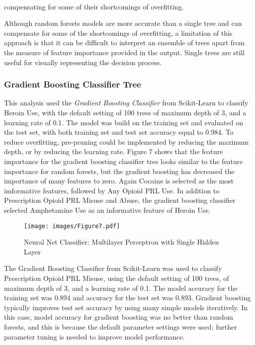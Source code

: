 \\\documentclass[sigconf]{acmart}
\begin{document}
compensating for some of their shortcomings of overfitting.

Although random forests models are more accurate than a single tree and can
compensate for some of the shortcomings of overfitting, a limitation of this 
approach is that it can be difficult to interpret an ensemble of trees apart 
from the measure of feature importance provided in the output. Single trees 
are still useful for visually representing the decision process.

\subsubsection{Gradient Boosting Classifier Tree}


This analysis used the 
\emph{Gradient Boosting Classifier} from Scikit-Learn to classify Heroin Use, 
with the default setting of 100 trees of maximum depth of 3, and a learning 
rate of 0.1. The model was build on the training set and evaluated on the test 
set, with both training set and test set accuracy equal to 0.984. To reduce
overfitting, pre-pruning could be implemented by reducing the maximum depth, 
or by reducing the learning rate. Figure 7 shows that the feature importance 
for the gradient boosting classifier tree looks similar to the feature 
importance for random forests, but the gradient boosting has decreased the 
importance of many features to zero. Again Cocaine is selected as the most 
imformative features, followed by Any Opioid PRL Use. In addition to 
Prescription Opioid PRL Misuse and Abuse, the gradient boosting classifier 
selected Amphetamine Use as an informative feature of Heroin Use. 

\begin{figure}[!ht]
  \centering\texttt{[image: images/Figure7.pdf]}
  \caption{Neural Net Classifier: Multilayer Perceptron with Single Hidden Layer}
  \label{f:Figur7}
\end{figure}

The Gradient Boosting Classifier from Scikit-Learn was used to classify 
Prescription Opioid PRL Misuse, using the default setting of 100 trees, of 
maximum depth of 3, and a learning rate of 0.1. The model accuracy for the
training set was 0.894 and accuracy for the test set was 0.893. Gradient 
boosting typically improves test set accuracy by using many simple models 
iteratively. In this case, model accuracy for gradient boosting was no better 
than random forests, and this is because the default parameter settings were
used; further parameter tuning is needed to improve model performance.
\end{document}
